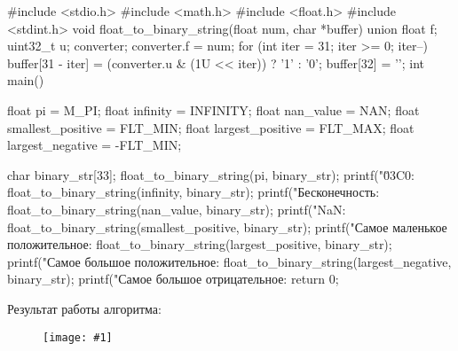 \documentclass{report}
\newcommand{\drawzalupa}[2]{
	\begin{figure}[H]
		\centering
		\texttt{[image: \#1]}
	\end{figure}
}
\begin{document}
	\begin{code}
#include <stdio.h>
#include <math.h>
#include <float.h>
#include <stdint.h>
void float_to_binary_string(float num, char *buffer) {
	union {
		float f;
		uint32_t u;
	} converter;
	converter.f = num;
	for (int iter = 31; iter >= 0; iter--)
	buffer[31 - iter] = (converter.u & (1U << iter)) ? '1' : '0';
	buffer[32] = '\0';
}
int main() {
	float pi = M_PI;
	float infinity = INFINITY;
	float nan_value = NAN;
	float smallest_positive = FLT_MIN;
	float largest_positive = FLT_MAX;
	float largest_negative = -FLT_MIN;
	
	char binary_str[33];
	float_to_binary_string(pi, binary_str);
	printf("\u03C0: %
	float_to_binary_string(infinity, binary_str);
	printf("Бесконечность: %
	float_to_binary_string(nan_value, binary_str);
	printf("NaN: %
	float_to_binary_string(smallest_positive, binary_str);
	printf("Самое маленькое положительное: %
	float_to_binary_string(largest_positive, binary_str);
	printf("Самое большое положительное: %
	float_to_binary_string(largest_negative, binary_str);
	printf("Самое большое отрицательное: %
	return 0;
}
	\end{code}		
	
	Результат работы алгоритма:
	
	\drawzalupa{images/task3.png}{1}
	
\end{document}
